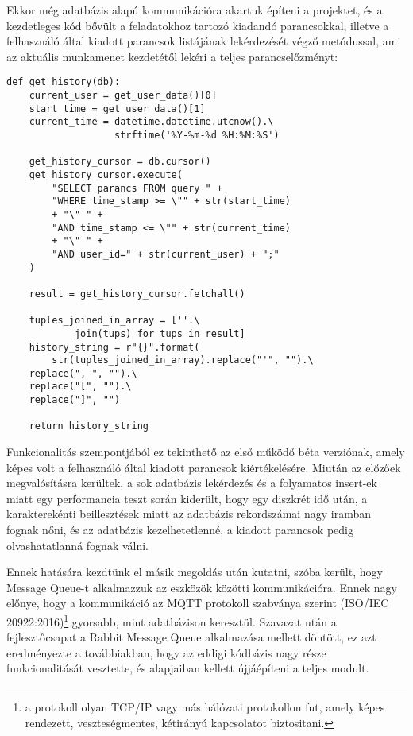 \documentclass[12pt]{report}
\begin{document}
Ekkor még adatbázis alapú kommunikációra akartuk építeni a projektet, és a kezdetleges kód bővült a feladatokhoz tartozó kiadandó parancsokkal, illetve a felhasználó által kiadott parancsok listájának lekérdezését végző metódussal, ami az aktuális munkamenet kezdetétől lekéri a teljes parancselőzményt:

\begin{verbatim}
def get_history(db):
    current_user = get_user_data()[0]
    start_time = get_user_data()[1]
    current_time = datetime.datetime.utcnow().\
                   strftime('%Y-%m-%d %H:%M:%S')

    get_history_cursor = db.cursor()
    get_history_cursor.execute(
        "SELECT parancs FROM query " +
        "WHERE time_stamp >= \"" + str(start_time) 
        + "\" " +
        "AND time_stamp <= \"" + str(current_time)
        + "\" " +
        "AND user_id=" + str(current_user) + ";"
    )

    result = get_history_cursor.fetchall()

    tuples_joined_in_array = [''.\
            join(tups) for tups in result]
    history_string = r"{}".format(
        str(tuples_joined_in_array).replace("'", "").\
    replace(", ", "").\
    replace("[", "").\
    replace("]", "")

    return history_string
\end{verbatim}

Funkcionalitás szempontjából ez tekinthető az első működő béta verziónak, amely képes volt a felhasználó által kiadott parancsok kiértékelésére.
Miután az előzőek megvalósításra kerültek, a sok adatbázis lekérdezés és a folyamatos insert-ek miatt egy performancia teszt során kiderült, hogy egy diszkrét idő után, a karakterekénti beillesztések miatt az adatbázis rekordszámai nagy iramban fognak nőni, és az adatbázis kezelhetetlenné, a kiadott parancsok pedig olvashatatlanná fognak válni.

Ennek hatására kezdtünk el másik megoldás után kutatni, szóba került, hogy Message Queue-t alkalmazzuk az eszközök közötti kommunikációra. Ennek nagy előnye, hogy a kommunikáció az MQTT protokoll szabványa szerint (ISO/IEC 20922:2016)\footnote{a protokoll olyan TCP/IP vagy más hálózati protokollon fut, amely képes rendezett, veszteségmentes, kétirányú kapcsolatot biztositani.} gyorsabb, mint adatbázison keresztül.
Szavazat után a fejlesztőcsapat a Rabbit Message Queue alkalmazása mellett döntött, ez azt eredményezte a továbbiakban, hogy az eddigi kódbázis nagy része funkcionalitását vesztette, és alapjaiban kellett újjáépíteni a teljes modult.
\end{document}

